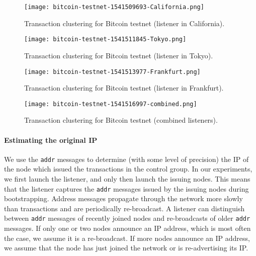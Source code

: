 \begin{figure*}
	\centering
	\begin{minipage}{0.5\textwidth}
		\centering
		\texttt{[image: bitcoin-testnet-1541509693-California.png]}
		\caption{Transaction clustering for Bitcoin testnet (listener in California).}
		\label{fig:bitcoin-testnet-california}
	\end{minipage}\hfill
	\begin{minipage}{0.5\textwidth}
		\centering
		\texttt{[image: bitcoin-testnet-1541511845-Tokyo.png]}
		\caption{Transaction clustering for Bitcoin testnet (listener in Tokyo).}
		\label{fig:bitcoin-testnet-tokyo}
	\end{minipage}\hfill
\end{figure*}

\begin{figure*}
	\centering
	\begin{minipage}{0.5\textwidth}
		\centering
		\texttt{[image: bitcoin-testnet-1541513977-Frankfurt.png]}
		\caption{Transaction clustering for Bitcoin testnet (listener in Frankfurt).}
		\label{fig:bitcoin-testnet-frankfurt}
	\end{minipage}\hfill
	\begin{minipage}{0.5\textwidth}
		\centering
		\texttt{[image: bitcoin-testnet-1541516997-combined.png]}
		\caption{Transaction clustering for Bitcoin testnet (combined listeners).}
		\label{fig:bitcoin-testnet-combined}
	\end{minipage}\hfill
\end{figure*}


\paragraph{Estimating the original IP}

We use the \texttt{addr} messages to determine (with some level of precision) the IP of the node which issued the transactions in the control group.
In our experiments, we first launch the listener, and only then launch the issuing nodes.
This means that the listener captures the \texttt{addr} messages issued by the issuing nodes during bootstrapping.
Address messages propagate through the network more slowly than transactions and are periodically re-broadcast.
A listener can distinguish between \texttt{addr} messages of recently joined nodes and re-broadcasts of older \texttt{addr} messages.
If only one or two nodes announce an IP address, which is most often the case, we assume it is a re-broadcast.
If more nodes announce an IP address, we assume that the node has just joined the network or is re-advertising its IP.

